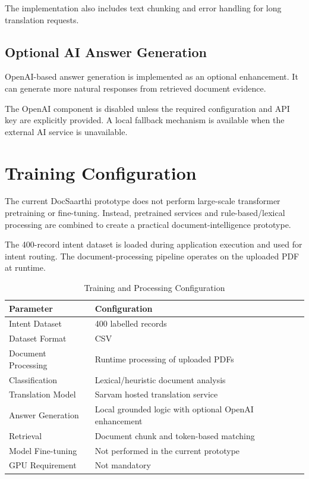 The implementation also includes text chunking and error handling for
long translation requests.

\subsection{Optional AI Answer Generation}

OpenAI-based answer generation is implemented as an optional
enhancement. It can generate more natural responses from retrieved
document evidence.

The OpenAI component is disabled unless the required configuration and
API key are explicitly provided. A local fallback mechanism is
available when the external AI service is unavailable.

\section{Training Configuration}

The current DocSaarthi prototype does not perform large-scale
transformer pretraining or fine-tuning. Instead, pretrained services
and rule-based/lexical processing are combined to create a practical
document-intelligence prototype.

The 400-record intent dataset is loaded during application execution
and used for intent routing. The document-processing pipeline operates
on the uploaded PDF at runtime.

\begin{table}[H]
\centering
\caption{Training and Processing Configuration}
\begin{tabular}{|p{5cm}|p{8cm}|}
\hline
\textbf{Parameter} & \textbf{Configuration} \\
\hline
Intent Dataset & 400 labelled records \\
\hline
Dataset Format & CSV \\
\hline
Document Processing & Runtime processing of uploaded PDFs \\
\hline
Classification & Lexical/heuristic document analysis \\
\hline
Translation Model & Sarvam hosted translation service \\
\hline
Answer Generation & Local grounded logic with optional OpenAI enhancement \\
\hline
Retrieval & Document chunk and token-based matching \\
\hline
Model Fine-tuning & Not performed in the current prototype \\
\hline
GPU Requirement & Not mandatory \\
\hline
\end{tabular}
\end{table}

